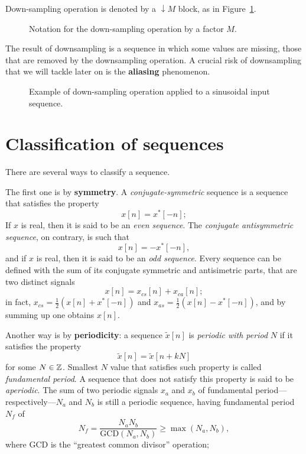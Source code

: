 \documentclass[\documentfontsize, twocolumn]{\classname}
\begin{document}
Down-sampling operation is denoted by a $\downarrow M$ block, as in Figure~\ref{tikz:downsamplingOperation}.
\begin{figure}[ht]
\begin{center}
    \caption{Notation for the down-sampling operation by a factor $M$.}\label{tikz:downsamplingOperation}
\end{center}
\end{figure}
The result of downsampling is a se\-quen\-ce in which some values are missing, those that are removed by the downsampling operation. A crucial risk of downsampling that we will tackle later on is the \textbf{aliasing} phenomenon.
\begin{figure*}[ht]
    \centering
    \scalebox{0.6}{
    
    }\caption{Example of down-sampling operation applied to a sinusoidal input se\-quen\-ce.}\label{oct:downsamplingOperationEffect}
\end{figure*}


\section{Classification of se\-quen\-ces}

There are several ways to classify a se\-quen\-ce.

The first one is by \textbf{symmetry}. A \emph{conjugate-symmetric} se\-quen\-ce is a se\-quen\-ce that satisfies the property \[x[n] = x^*[-n];\] If $x$ is real, then it is said to be an \emph{even se\-quen\-ce}. The \emph{conjugate antisymmetric se\-quen\-ce}, on contrary, is such that \[x[n] = -x^*[-n],\] and if $x$ is real, then it is said to be an \emph{odd se\-quen\-ce}. Every se\-quen\-ce can be defined with the sum of its conjugate symmetric and antisimetric parts, that are two distinct signals \[x[n] = x_{cs}[n] + x_{ca}[n];\] in fact, $x_{cs} = \frac{1}{2}(x[n] + x^*[-n])$ and $x_{as} = \frac{1}{2}(x[n] - x^*[-n])$, and by summing up one obtains $x[n]$.

Another way is by \textbf{periodicity}: a se\-quen\-ce $\tilde{x}[n]$ is \emph{periodic with period} $N$ if it satisfies the property \[\tilde{x}[n] = \tilde{x}[n + kN]\] for some $N \in \mathbb Z$. Smallest $N$ value that satisfies such property is called \emph{fundamental period}. A se\-quen\-ce that does not satisfy this property is said to be \emph{aperiodic}. The sum of two periodic signals $x_a$ and $x_b$ of fundamental period---re\-spec\-ti\-ve\-ly---$N_a$ and $N_b$ is still a periodic se\-quen\-ce, having fundamental period $N_f$ of \[N_f = \frac{N_a N_b}{\mathrm{GCD}(N_a, N_b)} \geq \max{(N_a, N_b)},\] where $\mathrm{GCD}$ is the ``greatest common divisor'' operation;
\end{document}
